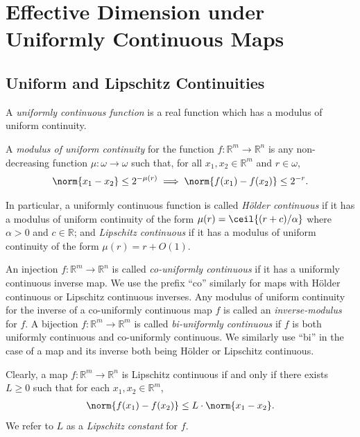 \section{Effective Dimension under Uniformly Continuous Maps}

\label{section:Effective_Dimension_under_Uniformly_Continuous_Maps}

\subsection{Uniform and Lipschitz Continuities}

A \textit{uniformly continuous function} is a real function which has a modulus of uniform continuity.

\begin{definition}
    A \textit{modulus of uniform continuity} for the function $f : \mathbb{R}^m \to \mathbb{R}^n$ is any non-decreasing function $\mu : \omega \to \omega$ such that, for all $x_1, x_2 \in \mathbb{R}^m$ and $r \in \omega$, 
    \begin{align*}
        \norm{x_1 - x_2} \leq 2^{-\mu(r)} \implies \norm{f(x_1) - f(x_2)} \leq 2^{-r}.
    \end{align*}
\end{definition}

In particular, a uniformly continuous function is called \textit{H{\"o}lder continuous} if it has a modulus of uniform continuity of the form $\mu(r) = \ceil{(r + c) / \alpha}$ where $\alpha > 0$ and $c \in \mathbb{R}$; and \textit{Lipschitz continuous} if it has a modulus of uniform continuity of the form $\mu(r) = r + O(1)$. 

An injection $f: \mathbb{R}^m \to \mathbb{R}^n$ is called \textit{co-uniformly continuous} if it has a uniformly continuous inverse map. We use the prefix ``co'' similarly for maps with H{\"o}lder continuous or Lipschitz continuous inverses. Any modulus of uniform continuity for the inverse of a co-uniformly continuous map $f$ is called an \textit{inverse-modulus} for $f$. A bijection $f : \mathbb{R}^m \to \mathbb{R}^m$ is called \textit{bi-uniformly continuous} if $f$ is both uniformly continuous and co-uniformly continuous. We similarly use ``bi'' in the case of a map and its inverse both being H{\"o}lder or Lipschitz continuous.

Clearly, a map $f: \mathbb{R}^m \to \mathbb{R}^n$ is Lipschitz continuous if and only if there exists $L \geq 0$ such that for each $x_1, x_2 \in \mathbb{R}^m$, 
\begin{align*}
    \norm{f(x_1) - f(x_2)} \leq L \cdot \norm{x_1 - x_2}.
\end{align*}
We refer to $L$ as a \textit{Lipschitz constant} for $f$.

